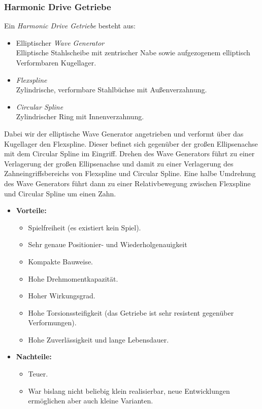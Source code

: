 			\subsubsection{Harmonic Drive Getriebe}
				Ein \emph{Harmonic Drive Getriebe} besteht aus:
				\begin{itemize}
					\item Elliptischer \emph{Wave Generator} \\ Elliptische Stahlscheibe mit zentrischer Nabe sowie aufgezogenem elliptisch Verformbaren Kugellager.
					\item \emph{Flexspline} \\ Zylindrische, verformbare Stahlbüchse mit Außenverzahnung.
					\item \emph{Circular Spline} \\ Zylindrischer Ring mit Innenverzahnung.
				\end{itemize}

				Dabei wir der elliptische Wave Generator angetrieben und verformt über das Kugellager den Flexspline. Dieser befinet sich gegenüber der großen Ellipsenachse mit dem Circular Spline im Eingriff. Drehen des Wave Generators führt zu einer Verlagerung der großen Ellipsenachse und damit zu einer Verlagerung  des Zahneingriffsbereichs von Flexspline und Circular Spline. Eine halbe Umdrehung des Wave Generators führt dann zu einer Relativbewegung zwischen Flexspline und Circular Spline um einen Zahn.

				\begin{itemize}
					\item \textbf{Vorteile:}
						\begin{itemize}
							\item Spielfreiheit (\dh es existiert kein Spiel).
							\item Sehr genaue Positionier- und Wiederholgenauigkeit
							\item Kompakte Bauweise.
							\item Hohe Drehmomentkapazität.
							\item Hoher Wirkungsgrad.
							\item Hohe Torsionssteifigkeit (\dh das Getriebe ist sehr resistent gegenüber Verformungen).
							\item Hohe Zuverlässigkeit und lange Lebensdauer.
						\end{itemize}
					\item \textbf{Nachteile:}
						\begin{itemize}
							\item Teuer.
							\item War bislang nicht beliebig klein realisierbar, neue Entwicklungen ermöglichen aber auch kleine Varianten.
						\end{itemize}
				\end{itemize}

